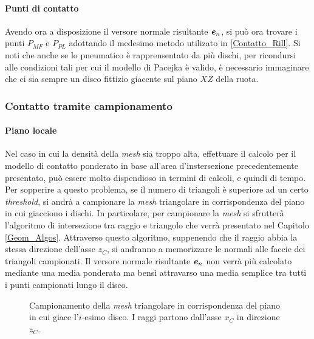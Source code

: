 \paragraph{Punti di contatto}
Avendo ora a disposizione il versore normale risultante $\textbf{\textit{e}}_n$, si può ora trovare i punti $P_{MF}$ e $P_{PL}$ adottando il medesimo metodo utilizato in \ref{Contatto_Rill}. Si noti che anche se lo pneumatico è rapprensentato da più dischi, per ricondursi alle condizioni tali per cui il modello di Pacejka è valido, è necessario immaginare che ci sia sempre un disco fittizio giacente sul piano $XZ$ della ruota.
%
\subsubsection{Contatto tramite campionamento}
\paragraph{Piano locale}
Nel caso in cui la densità della \textit{mesh} sia troppo alta, effettuare il calcolo per il modello di contatto ponderato in base all'area d'instersezione precedentemente presentato, può essere molto dispendioso in termini di calcoli, e quindi di tempo. Per sopperire a questo problema, se il numero di triangoli è superiore ad un certo \textit{threshold}, si andrà a campionare la \textit{mesh} triangolare in corrispondenza del piano in cui giacciono i dischi. In particolare, per campionare la \textit{mesh} si sfrutterà l'algoritmo di intersezione tra raggio e triangolo che verrà presentato nel Capitolo \ref{Geom_Algos}. Attraverso questo algoritmo, suppenendo che il raggio abbia la stessa direzione dell'asse $z_C$, si andranno a memorizzare le normali alle faccie dei triangoli campionati. Il versore normale risultante $\textbf{\textit{e}}_n$ non verrà più calcolato mediante una media ponderata ma bensì attravarso una media semplice tra tutti i punti campionati lungo il disco.

\begin{figure}
	\centering
	\caption{Campionamento della \textit{mesh} triangolare in corrispondenza del piano in cui giace l'$i$-esimo disco. I raggi partono dall'asse $x_C$ in direzione $z_C$.}
\end{figure}

